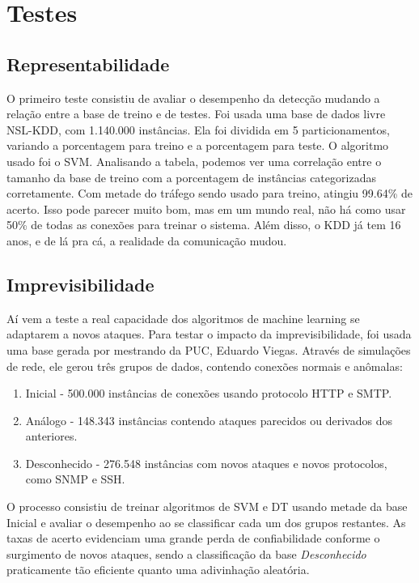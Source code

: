 \documentclass[12pt,a4paper]{article}
\begin{document}
\section{Testes}
    \subsection{Representabilidade}
    O primeiro teste consistiu de avaliar o desempenho da detecção mudando a relação entre a base de treino e de testes.
    Foi usada uma base de dados livre NSL-KDD, com 1.140.000 instâncias. Ela foi dividida em 5 particionamentos, variando
    a porcentagem para treino e a porcentagem para teste. O algoritmo usado foi o SVM.
    Analisando a tabela, podemos ver uma correlação entre o tamanho da base de treino com a porcentagem de instâncias
    categorizadas corretamente. Com metade do tráfego sendo usado para treino, atingiu 99.64\% de acerto.
    Isso pode parecer muito bom, mas em um mundo real, não há como usar 50\% de todas as conexões para treinar o sistema.
    Além disso, o KDD já tem 16 anos, e de lá pra cá, a realidade da comunicação mudou.

    \subsection{Imprevisibilidade}
    Aí vem a teste a real capacidade dos algoritmos de machine learning se adaptarem a novos ataques. Para testar o
    impacto da imprevisibilidade, foi usada uma base gerada por mestrando da PUC, Eduardo Viegas. Através de simulações de
    rede, ele gerou três grupos de dados, contendo conexões normais e anômalas:
    \begin{enumerate}
        \item Inicial - 500.000 instâncias de conexões usando protocolo HTTP e SMTP.
        \item Análogo - 148.343 instâncias contendo ataques parecidos ou derivados dos anteriores.
        \item Desconhecido - 276.548 instâncias com novos ataques e novos protocolos, como SNMP e SSH.
    \end{enumerate}

    O processo consistiu de treinar algoritmos de SVM e DT usando metade da base Inicial e avaliar o desempenho
     ao se classificar cada um dos grupos restantes. As taxas de acerto evidenciam uma grande perda de confiabilidade
     conforme o surgimento de novos ataques, sendo a classificação da base \textit{Desconhecido} praticamente tão
     eficiente quanto uma adivinhação aleatória.
\end{document}
